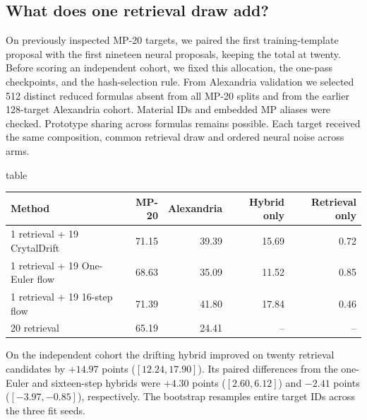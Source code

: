\subsection{What does one retrieval draw add?}
On previously inspected MP-20 targets, we paired the first training-template proposal with the first nineteen neural proposals, keeping the total at twenty. Before scoring an independent cohort, we fixed this allocation, the one-pass checkpoints, and the hash-selection rule. From Alexandria validation we selected 512 distinct reduced formulas absent from all MP-20 splits and from the earlier 128-target Alexandria cohort. Material IDs and embedded MP aliases were checked. Prototype sharing across formulas remains possible. Each target received the same composition, common retrieval draw and ordered neural noise across arms.

\begin{inplace}{table}\centering\small
\caption{Frozen one-template, nineteen-neural allocation. The first two columns give recovery as a percentage of all targets. The last two count Alexandria targets recovered exclusively by the hybrid or exclusively by twenty retrieval draws, expressed as percentages of all 512 targets averaged across seeds.}\label{t:hybrid}
\begin{tabular}{lrrrr}\hline Method & MP-20 & Alexandria & Hybrid only & Retrieval only\\\hline
1 retrieval + 19 CrytalDrift & 71.15 & 39.39 & 15.69 & 0.72 \\
1 retrieval + 19 One-Euler flow & 68.63 & 35.09 & 11.52 & 0.85 \\
1 retrieval + 19 16-step flow & 71.39 & 41.80 & 17.84 & 0.46 \\
20 retrieval & 65.19 & 24.41 & -- & -- \\\hline\end{tabular}\end{inplace}
On the independent cohort the drifting hybrid improved on twenty retrieval candidates by $+14.97$ points ($[12.24,17.90]$). Its paired differences from the one-Euler and sixteen-step hybrids were $+4.30$ points ($[2.60,6.12]$) and $-2.41$ points ($[-3.97,-0.85]$), respectively. The bootstrap resamples entire target IDs across the three fit seeds.
